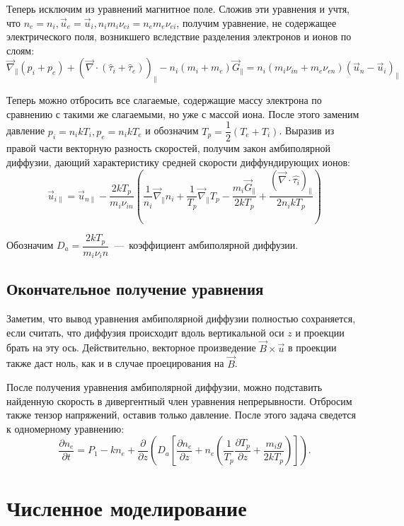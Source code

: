 \documentclass[12pt, a5paper, fleqn, twoside]{article}
\theoremstyle{definiton}
\theoremstyle{definition}
\begin{document}
Теперь исключим из уравнений магнитное поле. Сложив эти уравнения и учтя, что $n_e=n_i, \vec{u}_e=\vec{u}_i, n_im_i\nu_{ei}=n_em_e\nu_{ei}$, получим уравнение, не содержащее электрического поля, возникшего вследствие разделения электронов и ионов по слоям:
$$\vec{\nabla}_\parallel (p_i+p_e) + (\vec{\nabla}\cdot (\hat{\tau}_i+\hat{\tau}_e))_\parallel-n_i(m_i+m_e)\vec{G}_\parallel=n_i(m_i\nu_{in}+m_e\nu_{en})(\vec{u}_n-\vec{u}_i)_\parallel$$

Теперь можно отбросить все слагаемые, содержащие массу электрона по сравнению с такими же слагаемыми, но уже с массой иона. После этого заменим давление $p_i=n_ikT_i, p_e=n_ikT_e$ и обозначим $T_p=\dfrac{1}{2}(T_e+T_i)$. Выразив из правой части векторную разность скоростей, получим закон амбиполярной диффузии, дающий характеристику средней скорости диффундирующих ионов: 
$$\vec{u}_{i\parallel} = \vec{u}_{n\parallel} - \dfrac{2kT_p}{m_i\nu_{in}}\left(\dfrac{1}{n_i}\vec{\nabla}_\parallel n_i+\dfrac{1}{T_p}\vec{\nabla}_\parallel T_p-\dfrac{m_i\vec{G}_\parallel}{2kT_p}+\dfrac{(\vec{\nabla}\cdot\hat{\tau_i})_\parallel}{2n_ikT_p}\right)$$

Обозначим $D_a=\dfrac{2kT_p}{m_i\nu_in}$~---~коэффициент амбиполярной диффузии.

\subsection*{Окончательное получение уравнения}

Заметим, что вывод уравнения амбиполярной диффузии полностью сохраняется, если считать, что диффузия происходит вдоль вертикальной оси $z$ и проекции брать на эту ось. Действительно, векторное произведение $\vec{B}\times\vec{u}$ в проекции также даст ноль, как и в случае проецирования на $\vec{B}$.

После получения уравнения амбиполярной диффузии, можно подставить найденную скорость в дивергентный член уравнения непрерывности. Отбросим также тензор напряжений, оставив только давление. После этого задача сведется к одномерному уравнению:
$$\dfrac{\partial n_e}{\partial t}=P_1-kn_e + \dfrac{\partial}{\partial z}\left(D_a\left[\dfrac{\partial n_e}{\partial z}+n_e\left(\dfrac{1}{T_p}\dfrac{\partial T_p}{\partial z}+\dfrac{m_ig}{2kT_p}\right)\right]\right).$$

\newpage

\section*{Численное моделирование}
\end{document}
